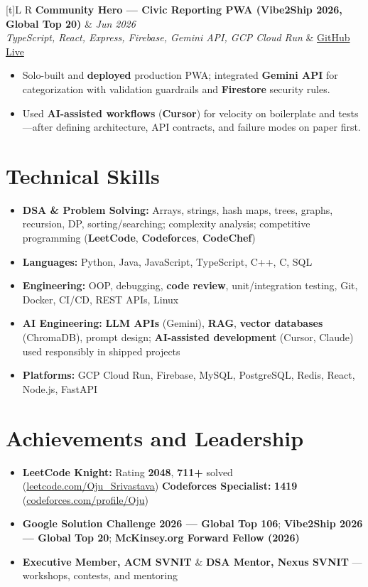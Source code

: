 \documentclass[a4paper,10pt]{article}
\newcommand{\resumeProject}[4]{%
  \vspace{0.5mm}
  \noindent
  \begin{tabularx}{\textwidth}[t]{L R}
    \textbf{#1} & \textit{#3} \\
    \textit{#2} & #4 \\
  \end{tabularx}
  \vspace{-0.5mm}%
}
\begin{document}
\resumeProject
  {Community Hero --- Civic Reporting PWA (Vibe2Ship 2026, Global Top 20)}
  {TypeScript, React, Express, Firebase, Gemini API, GCP Cloud Run}
  {Jun 2026}
  {\href{https://github.com/Ojas-Srivastava05/community-hero}{GitHub} \textbar{} \href{https://community-hero-987477089222.asia-south1.run.app}{Live}}
\begin{itemize}
  \item Solo-built and \textbf{deployed} production PWA; integrated \textbf{Gemini API} for categorization with validation guardrails and \textbf{Firestore} security rules.
  \item Used \textbf{AI-assisted workflows} (\textbf{Cursor}) for velocity on boilerplate and tests---after defining architecture, API contracts, and failure modes on paper first.
\end{itemize}

\section{Technical Skills}
\small
\begin{itemize}[label={}]
  \item \textbf{DSA \& Problem Solving:} Arrays, strings, hash maps, trees, graphs, recursion, DP, sorting/searching; complexity analysis; competitive programming (\textbf{LeetCode}, \textbf{Codeforces}, \textbf{CodeChef})
  \item \textbf{Languages:} Python, Java, JavaScript, TypeScript, C++, C, SQL
  \item \textbf{Engineering:} OOP, debugging, \textbf{code review}, unit/integration testing, Git, Docker, CI/CD, REST APIs, Linux
  \item \textbf{AI Engineering:} \textbf{LLM APIs} (Gemini), \textbf{RAG}, \textbf{vector databases} (ChromaDB), prompt design; \textbf{AI-assisted development} (Cursor, Claude) used responsibly in shipped projects
  \item \textbf{Platforms:} GCP Cloud Run, Firebase, MySQL, PostgreSQL, Redis, React, Node.js, FastAPI
\end{itemize}

\section{Achievements and Leadership}
\small
\begin{itemize}
  \item \textbf{LeetCode Knight:} Rating \textbf{2048}, \textbf{711+} solved (\href{https://leetcode.com/Oju_Srivastava}{leetcode.com/Oju\_Srivastava}) \textbar{} \textbf{Codeforces Specialist:} \textbf{1419} (\href{https://codeforces.com/profile/Oju}{codeforces.com/profile/Oju})
  \item \textbf{Google Solution Challenge 2026 --- Global Top 106}; \textbf{Vibe2Ship 2026 --- Global Top 20}; \textbf{McKinsey.org Forward Fellow (2026)}
  \item \textbf{Executive Member, ACM SVNIT} \& \textbf{DSA Mentor, Nexus SVNIT} --- workshops, contests, and mentoring
\end{itemize}
\end{document}
